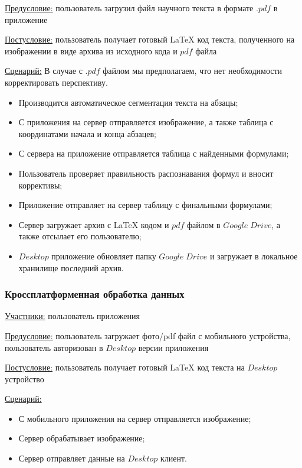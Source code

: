 \underline{Предусловие:} пользователь загрузил файл научного текста в формате $.pdf$ в приложение

\underline{Постусловие:} пользователь получает готовый \LaTeX\; код текста, полученного на изображении в виде архива из исходного кода и $pdf$ файла

\underline{Сценарий:}
В случае с $.pdf$ файлом мы предполагаем, что нет необходимости корректировать перспективу.
\begin{itemize}
    \item Производится автоматическое сегментация текста на абзацы;
    \item С приложения на сервер отправляется изображение, а также таблица с координатами начала и конца абзацев;
    \item С сервера на приложение отправляется таблица с найденными формулами;
    \item Пользователь проверяет правильность распознавания формул и вносит коррективы;
    \item Приложение отправляет на сервер таблицу с финальными формулами;
    \item Сервер загружает архив с \LaTeX\; кодом и $pdf$ файлом в $Google\;Drive$, а также отсылает его пользователю;
    \item $Desktop$ приложение обновляет папку $Google\;Drive$ и загружает в локальное хранилище последний архив.
\end{itemize}

\subsubsection{Кроссплатформенная обработка данных}
\underline{Участники:} пользователь приложения

\underline{Предусловие:} пользователь загружает фото/pdf файл с мобильного устройства, пользователь авторизован в $Desktop$ версии приложения

\underline{Постусловие:} пользователь получает готовый \LaTeX\; код текста на $Desktop$ устройство

\underline{Сценарий:}
\begin{itemize}
    \item С мобильного приложения на сервер отправляется изображение;
    \item Сервер обрабатывает изображение;
    \item Сервер отправляет данные на $Desktop$ клиент.
\end{itemize}

